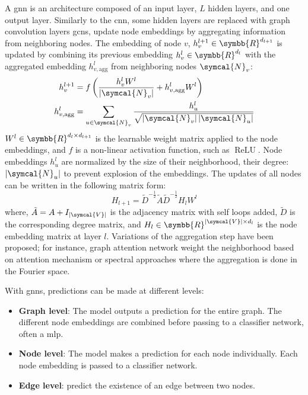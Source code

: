 \documentclass[../main.tex]{subfiles}
\begin{document}
		A \gls{gnn} is an architecture composed of an input layer, \(L\) hidden layers, and one output layer.
		Similarly to the \gls{cnn}, some hidden layers are replaced with graph convolution layers
		\Glspl{gcn}, update node embeddings by aggregating information from neighboring nodes.
		The embedding of node \(v\), \(h^{l+1}_{v} \in \symbb{R}^{d_{l+1}}\) is updated by combining its previous embedding \(h^{l}_{v} \in \symbb{R}^{d_{l}}\) with the aggregated embedding \(h^{l}_{v,\text{agg}}\) from neighboring nodes \(\symcal{N}_{v}\):
		\begin{align}
			h^{l+1}_{v}          & = f\left( \frac{h^{l}_{v}W^{l}}{\left|\symcal{N}_{v} \right|} + h^{l}_{v,\text{agg}}W^{l}\right)                \\
			h^{l}_{v,\text{agg}} & = \sum_{u \in \symcal{N}_{v}} \frac{h^{l}_{u}}{\sqrt{\left|\symcal{N}_{v} \right|\left|\symcal{N}_{u} \right|}}
		\end{align}
		\(W^{l} \in \symbb{R}^{d_{l}\times d_{l+1}}\) is the learnable weight matrix applied to the node embeddings, and \(f\) is a non-linear activation function, such as \(\operatorname{ReLU}\).
		Node embeddings \(h_{u}^{l}\) are normalized by the size of their neighborhood, \ie{}their degree: \(\left|\symcal{N}_{u} \right|\) to prevent explosion of the embeddings.
		The updates of all nodes can be written in the following matrix form:
		\begin{equation}
			H_{l+1} = \tilde{D}^{-\tfrac12}\tilde{A}\tilde{D}^{-\tfrac12}H_{l}W^{l}
		\end{equation}
		where, \(\tilde{A} = A + I_{\left|\symcal{V}\right|}\) is the adjacency matrix with self loops added, \(\tilde{D}\) is the corresponding degree matrix, and \(H_{l} \in \symbb{R}^{\left|\symcal{V}\right| \times d_{l}}\) is the node embedding matrix at layer \(l\).
		Variations of the aggregation step have been proposed; for instance, graph attention network weight the neighborhood based on attention mechanism or spectral approaches where the aggregation is done in the Fourier space.

		With \glspl{gnn}, predictions can be made at different levels:
		\begin{itemize}[nosep]
			\item \textbf{Graph level}: The model outputs a prediction for the entire graph.
				The different node embeddings are combined before passing to a classifier network, often a \gls{mlp}.
			\item \textbf{Node level}: The model makes a prediction for each node individually.
				Each node embedding is passed to a classifier network.
			\item \textbf{Edge level}: predict the existence of an edge between two nodes.
		\end{itemize}
\end{document}
